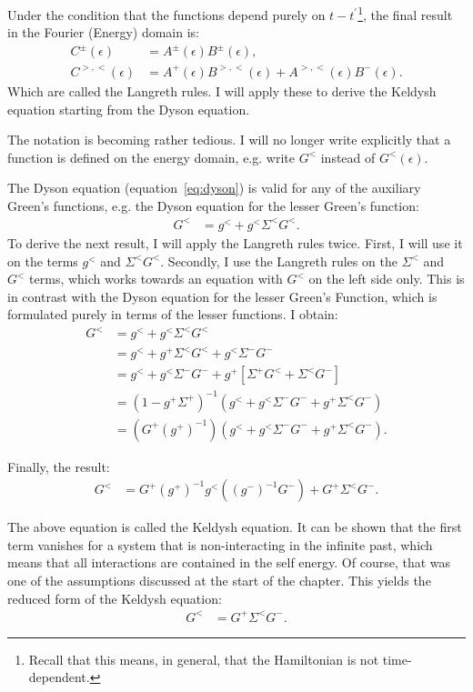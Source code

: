 Under the condition that the functions depend purely on $t-t^\prime$\footnote{Recall that this means, in general, that the Hamiltonian is not time-dependent.}, the final result in the Fourier (Energy) domain is:
\begin{align*}
C^\pm (\epsilon) &= 
A^\pm (\epsilon) 
B^\pm (\epsilon),\\
C^{>,<} (\epsilon) &= 
A^+ (\epsilon) 
B^{>,<} (\epsilon) + 
A^{>,<} (\epsilon) 
B^- (\epsilon).
\end{align*}
Which are called the Langreth rules. I will apply these to derive the Keldysh equation starting from the Dyson equation.
 
The notation is becoming rather tedious. I will no longer write explicitly that a function is defined on the energy domain, e.g. write $G^<$ instead of $G^<(\epsilon)$.

The Dyson equation (equation~\ref{eq:dyson}) is valid for any of the auxiliary Green's functions, e.g. the Dyson equation for the lesser Green's function:
\begin{align*}
G^< &= g^< + g^< \Sigma^< G^< . 
\end{align*}
To derive the next result, I will apply the Langreth rules twice. First, I will use it on the terms $g^<$ and $\Sigma^< G^<$. Secondly, I use the Langreth rules on the $\Sigma^<$ and $G^<$ terms, which works towards an equation with $G^<$ on the left side only. This is in contrast with the Dyson equation for the lesser Green's Function, which is formulated purely in terms of the lesser functions. I obtain:
\begin{align*} 
G^< &= g^<  + g^< \Sigma^< G^< \\
 &= g^<  + g^+ \Sigma^< G^< + g^< \Sigma^- G^- \\
 &= g^<  + g^< \Sigma^- G^- + g^+ \left[ \Sigma^+ G^< + \Sigma^< G^- \right]\\
 &= (1 - g^+ \Sigma^+)^{-1} \left( g^<  + g^< \Sigma^- G^- + g^+ \Sigma^< G^-\right) \\
 &= \left(G^+ (g^+)^{-1}\right)\left( g^<  + g^< \Sigma^- G^- + g^+ \Sigma^< G^-\right).
\end{align*}

Finally, the result:
\begin{align}
G^< &= G^+ (g^+)^{-1} g^< \left((g^-)^{-1}G^-  \right) + G^+  \Sigma^< G^-. \label{eq:keldysh}
\end{align}

The above equation is called the Keldysh equation. It can be shown that the first term vanishes for a system that is non\hyp{}interacting in the infinite past, which means that all interactions are contained in the self energy. Of course, that was one of the assumptions discussed at the start of the chapter. This yields the reduced form of the Keldysh equation:
\begin{align*}
G^< &=  G^+ \Sigma^< G^-.
\end{align*}

